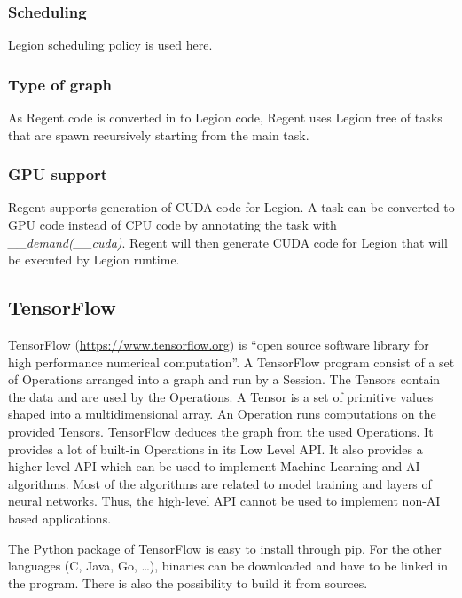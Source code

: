 \subsubsection{Scheduling}
Legion scheduling policy is used here.

\subsubsection{Type of graph}
As Regent code is converted in to Legion code, Regent uses Legion tree of tasks that are spawn recursively starting from the main task.

\subsubsection{GPU support}
Regent supports generation of CUDA code for Legion.
A task can be converted to GPU code instead of CPU code by annotating the task with \textit{\_\_demand(\_\_cuda)}.
Regent will then generate CUDA code for Legion that will be executed by Legion runtime.


\subsection{TensorFlow}
TensorFlow \cite{AABBC2016} (\url{https://www.tensorflow.org}) is “open source software library for high performance numerical computation”.
A TensorFlow program consist of a set of Operations arranged into a graph and run by a Session.
The Tensors contain the data and are used by the Operations.
A Tensor is a set of primitive values shaped into a multidimensional array.
An Operation runs computations on the provided Tensors.
TensorFlow deduces the graph from the used Operations.
It provides a lot of built-in Operations in its Low Level API.
It also provides a higher-level API which can be used to implement Machine Learning and AI algorithms.
Most of the algorithms are related to model training and layers of neural networks.
Thus, the high-level API cannot be used to implement non-AI based applications.

The Python package of TensorFlow is easy to install through pip.
For the other languages (C, Java, Go, \dots), binaries can be downloaded and have to be linked in the program.
There is also the possibility to build it from sources.

\begin{figure}[h]

\end{figure}

